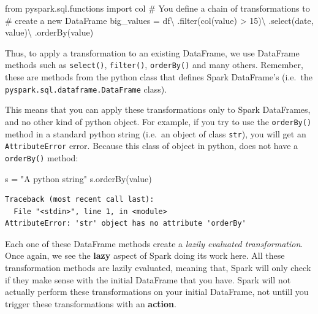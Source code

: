 \documentclass[
  11pt,
  letterpaper,
  DIV=11,
  numbers=noendperiod]{scrreprt}
\newenvironment{Shaded}{\begin{snugshade}}{\end{snugshade}}
\newcommand{\BuiltInTok}[1]{\textcolor[rgb]{0.00,0.23,0.31}{#1}}
\newcommand{\CommentTok}[1]{\textcolor[rgb]{0.37,0.37,0.37}{#1}}
\newcommand{\DecValTok}[1]{\textcolor[rgb]{0.68,0.00,0.00}{#1}}
\newcommand{\ImportTok}[1]{\textcolor[rgb]{0.00,0.46,0.62}{#1}}
\newcommand{\NormalTok}[1]{\textcolor[rgb]{0.00,0.23,0.31}{#1}}
\newcommand{\OperatorTok}[1]{\textcolor[rgb]{0.37,0.37,0.37}{#1}}
\newcommand{\StringTok}[1]{\textcolor[rgb]{0.13,0.47,0.30}{#1}}
\begin{document}
\begin{Shaded}
\begin{Highlighting}[]
\ImportTok{from}\NormalTok{ pyspark.sql.functions }\ImportTok{import}\NormalTok{ col}
\CommentTok{\# You define a chain of transformations to}
\CommentTok{\# create a new DataFrame}
\NormalTok{big\_values }\OperatorTok{=}\NormalTok{ df}\OperatorTok{\textbackslash{}}
\NormalTok{  .}\BuiltInTok{filter}\NormalTok{(col(}\StringTok{\textquotesingle{}value\textquotesingle{}}\NormalTok{) }\OperatorTok{\textgreater{}} \DecValTok{15}\NormalTok{)}\OperatorTok{\textbackslash{}}
\NormalTok{  .select(}\StringTok{\textquotesingle{}date\textquotesingle{}}\NormalTok{, }\StringTok{\textquotesingle{}value\textquotesingle{}}\NormalTok{)}\OperatorTok{\textbackslash{}}
\NormalTok{  .orderBy(}\StringTok{\textquotesingle{}value\textquotesingle{}}\NormalTok{)}
\end{Highlighting}
\end{Shaded}

Thus, to apply a transformation to an existing DataFrame, we use
DataFrame methods such as \texttt{select()}, \texttt{filter()},
\texttt{orderBy()} and many others. Remember, these are methods from the
python class that defines Spark DataFrame's (i.e.~the
\texttt{pyspark.sql.dataframe.DataFrame} class).

This means that you can apply these transformations only to Spark
DataFrames, and no other kind of python object. For example, if you try
to use the \texttt{orderBy()} method in a standard python string
(i.e.~an object of class \texttt{str}), you will get an
\texttt{AttributeError} error. Because this class of object in python,
does not have a \texttt{orderBy()} method:

\begin{Shaded}
\begin{Highlighting}[]
\NormalTok{s }\OperatorTok{=} \StringTok{"A python string"}
\NormalTok{s.orderBy(}\StringTok{\textquotesingle{}value\textquotesingle{}}\NormalTok{)}
\end{Highlighting}
\end{Shaded}

\begin{verbatim}
Traceback (most recent call last):
  File "<stdin>", line 1, in <module>
AttributeError: 'str' object has no attribute 'orderBy'
\end{verbatim}

Each one of these DataFrame methods create a \emph{lazily evaluated
transformation}. Once again, we see the \textbf{lazy} aspect of Spark
doing its work here. All these transformation methods are lazily
evaluated, meaning that, Spark will only check if they make sense with
the initial DataFrame that you have. Spark will not actually perform
these transformations on your initial DataFrame, not untill you trigger
these transformations with an \textbf{action}.
\end{document}
